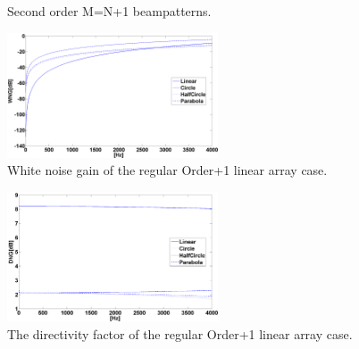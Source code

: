 \documentclass{article}
\begin{document}
\begin{center}
\begin{figure}[!h]
{			\label{FigLbl_SecondOrderArbGeo_Linear_BP}}
		\quad
		\quad
		\caption{Second order M=N+1 beampatterns.}
		\label{FigLbl_SecondOrderGeometriesBPs}
	\end{figure}
	\begin{figure}[!h]
		\centerline{\includegraphics[width=62.5mm]{SecondOrderArbGeo_WNG.png}} \caption{{White noise gain of the regular Order+1 linear array case.}}\label{FigLbl_SecondOrderArbGeo_WNG}
	\end{figure}
	\begin{figure}[!h]
		\centerline{\includegraphics[width=62.5mm]{SecondOrderArbGeo_DNG.png}} \caption{{The directivity factor of the regular Order+1 linear array case. }}\label{FigLbl_SecondOrderArbGeo_DNG}
	\end{figure}
\end{center}
\end{document}
